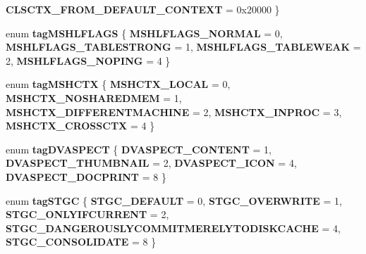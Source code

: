 \begin{DoxyCompactItemize}
{\bfseries C\+L\+S\+C\+T\+X\+\_\+\+F\+R\+O\+M\+\_\+\+D\+E\+F\+A\+U\+L\+T\+\_\+\+C\+O\+N\+T\+E\+XT} = 0x20000
 \}
\item 
\mbox{\label{interface_i_win_types_a87f5620ea302825c90eb89bf3f6386ed}} 
enum {\bfseries tag\+M\+S\+H\+L\+F\+L\+A\+GS} \{ {\bfseries M\+S\+H\+L\+F\+L\+A\+G\+S\+\_\+\+N\+O\+R\+M\+AL} = 0, 
{\bfseries M\+S\+H\+L\+F\+L\+A\+G\+S\+\_\+\+T\+A\+B\+L\+E\+S\+T\+R\+O\+NG} = 1, 
{\bfseries M\+S\+H\+L\+F\+L\+A\+G\+S\+\_\+\+T\+A\+B\+L\+E\+W\+E\+AK} = 2, 
{\bfseries M\+S\+H\+L\+F\+L\+A\+G\+S\+\_\+\+N\+O\+P\+I\+NG} = 4
 \}
\item 
\mbox{\label{interface_i_win_types_a1ffb08de3917cd132f4a7bdc48eb0138}} 
enum {\bfseries tag\+M\+S\+H\+C\+TX} \{ \newline
{\bfseries M\+S\+H\+C\+T\+X\+\_\+\+L\+O\+C\+AL} = 0, 
{\bfseries M\+S\+H\+C\+T\+X\+\_\+\+N\+O\+S\+H\+A\+R\+E\+D\+M\+EM} = 1, 
{\bfseries M\+S\+H\+C\+T\+X\+\_\+\+D\+I\+F\+F\+E\+R\+E\+N\+T\+M\+A\+C\+H\+I\+NE} = 2, 
{\bfseries M\+S\+H\+C\+T\+X\+\_\+\+I\+N\+P\+R\+OC} = 3, 
\newline
{\bfseries M\+S\+H\+C\+T\+X\+\_\+\+C\+R\+O\+S\+S\+C\+TX} = 4
 \}
\item 
\mbox{\label{interface_i_win_types_a5200d221daadd0474069963f36169b94}} 
enum {\bfseries tag\+D\+V\+A\+S\+P\+E\+CT} \{ {\bfseries D\+V\+A\+S\+P\+E\+C\+T\+\_\+\+C\+O\+N\+T\+E\+NT} = 1, 
{\bfseries D\+V\+A\+S\+P\+E\+C\+T\+\_\+\+T\+H\+U\+M\+B\+N\+A\+IL} = 2, 
{\bfseries D\+V\+A\+S\+P\+E\+C\+T\+\_\+\+I\+C\+ON} = 4, 
{\bfseries D\+V\+A\+S\+P\+E\+C\+T\+\_\+\+D\+O\+C\+P\+R\+I\+NT} = 8
 \}
\item 
\mbox{\label{interface_i_win_types_a64c85c20b9de7a85af5101e148b4be89}} 
enum {\bfseries tag\+S\+T\+GC} \{ \newline
{\bfseries S\+T\+G\+C\+\_\+\+D\+E\+F\+A\+U\+LT} = 0, 
{\bfseries S\+T\+G\+C\+\_\+\+O\+V\+E\+R\+W\+R\+I\+TE} = 1, 
{\bfseries S\+T\+G\+C\+\_\+\+O\+N\+L\+Y\+I\+F\+C\+U\+R\+R\+E\+NT} = 2, 
{\bfseries S\+T\+G\+C\+\_\+\+D\+A\+N\+G\+E\+R\+O\+U\+S\+L\+Y\+C\+O\+M\+M\+I\+T\+M\+E\+R\+E\+L\+Y\+T\+O\+D\+I\+S\+K\+C\+A\+C\+HE} = 4, 
\newline
{\bfseries S\+T\+G\+C\+\_\+\+C\+O\+N\+S\+O\+L\+I\+D\+A\+TE} = 8
 \}
\item 
\mbox{\label{interface_i_win_types_afac3416890780dbb80cef3f074d8fd4e}} 

\end{DoxyCompactItemize}
